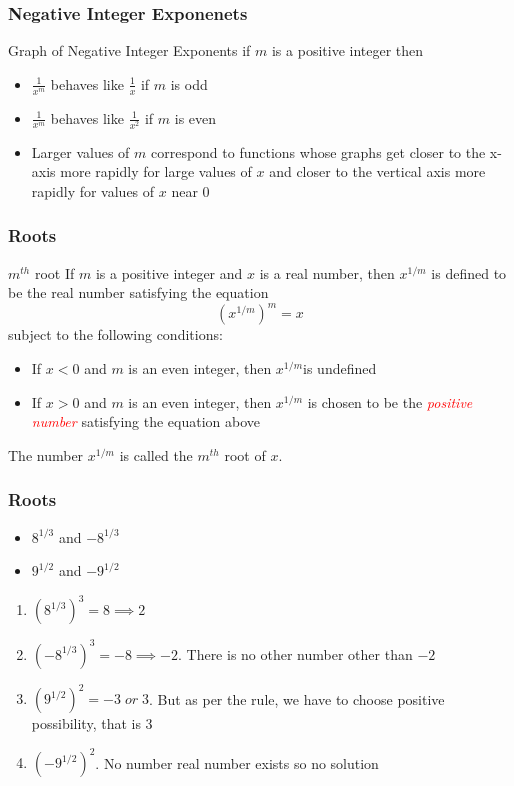 \documentclass{beamer}
\begin{document}
\begin{frame}
  \frametitle{Negative Integer Exponenets}
  \begin{alertblock}{Graph of Negative Integer Exponents}
    if \(m\) is  a positive integer then
    \begin{itemize}
      \item \(\frac{1}{x^{m}}\) behaves like \(\frac{1}{x}\) if \(m\) is odd
      \item \(\frac{1}{x^{m}}\) behaves like \(\frac{1}{x^{2}}\) if \(m\) is even
      \item Larger values of \(m\) correspond to functions whose graphs get closer to the x-axis more rapidly for large values of \(x\)
      and closer to the vertical axis more rapidly for values of \(x\) near 0
    \end{itemize} 
  \end{alertblock}  

\end{frame}

  \begin{frame}
    \frametitle{Roots}
    \begin{block}{\(m^{th}\) root}
   If \(m\) is a positive integer and \(x\) is a real number, then \(x^{1/m}\) is defined to be the real number satisfying the equation
   \[\left(x^{1/m}\right)^{m} = x \]
  subject to the following conditions:
  \begin{itemize}
    \item  If \(x < 0\) and \(m\) is an even integer, then \(x^{1/m} \)is undefined 
    \item If \(x > 0\) and \(m\) is an even integer, then \(x^{1/m} \) is chosen to be the \textit{\textcolor{red}{positive number}} satisfying the equation above
  \end{itemize}
The number \(x^{1/m}\) is called the \textbf{\(m^{th}\)} root of \(x\).
\end{block}
  
\end{frame}
\begin{frame}
  \frametitle{Roots}
  \begin{example}
    \begin{itemize}
      \item \(8^{1/3}\) and \(-8^{1/3}\)
      \item \(9^{1/2}\) and \(-9^{1/2}\)
    \end{itemize}
  \end{example}
  \begin{solution}
    \begin{enumerate}
      \item \( \left(8^{1/3}\right)^{3} = 8 \implies 2 \)
      \item \( \left(-8^{1/3}\right)^{3} = -8 \implies -2 \). There is no other number other than \(-2\)
      \item \( \left( 9^{1/2} \right)^{2} = -3 \; or \;3\). But as per the rule, we have to choose positive possibility, that is \(3\)
      \item \( \left( -9^{1/2} \right)^{2} \). No number real number exists so no solution 
    \end{enumerate}
  \end{solution}
\end{frame}
\end{document}
